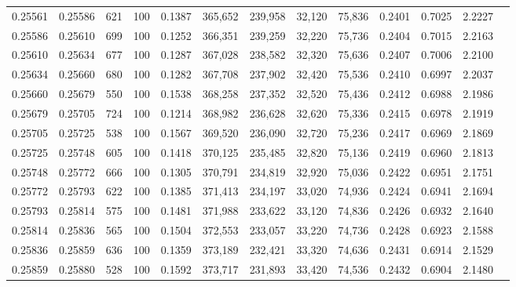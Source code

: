 \begin{tabular}{rrrrrrrrrrrrr}
0.25561 & 0.25586 &   621 & 100 &                                     0.1387 & 365,652 & 239,958 &  32,120 &  75,836 & 0.2401 & 0.7025 & 2.2227 \\
0.25586 & 0.25610 &   699 & 100 &                                     0.1252 & 366,351 & 239,259 &  32,220 &  75,736 & 0.2404 & 0.7015 & 2.2163 \\
0.25610 & 0.25634 &   677 & 100 &                                     0.1287 & 367,028 & 238,582 &  32,320 &  75,636 & 0.2407 & 0.7006 & 2.2100 \\
0.25634 & 0.25660 &   680 & 100 &                                     0.1282 & 367,708 & 237,902 &  32,420 &  75,536 & 0.2410 & 0.6997 & 2.2037 \\
0.25660 & 0.25679 &   550 & 100 &                                     0.1538 & 368,258 & 237,352 &  32,520 &  75,436 & 0.2412 & 0.6988 & 2.1986 \\
0.25679 & 0.25705 &   724 & 100 &                                     0.1214 & 368,982 & 236,628 &  32,620 &  75,336 & 0.2415 & 0.6978 & 2.1919 \\
0.25705 & 0.25725 &   538 & 100 &                                     0.1567 & 369,520 & 236,090 &  32,720 &  75,236 & 0.2417 & 0.6969 & 2.1869 \\
0.25725 & 0.25748 &   605 & 100 &                                     0.1418 & 370,125 & 235,485 &  32,820 &  75,136 & 0.2419 & 0.6960 & 2.1813 \\
0.25748 & 0.25772 &   666 & 100 &                                     0.1305 & 370,791 & 234,819 &  32,920 &  75,036 & 0.2422 & 0.6951 & 2.1751 \\
0.25772 & 0.25793 &   622 & 100 &                                     0.1385 & 371,413 & 234,197 &  33,020 &  74,936 & 0.2424 & 0.6941 & 2.1694 \\
0.25793 & 0.25814 &   575 & 100 &                                     0.1481 & 371,988 & 233,622 &  33,120 &  74,836 & 0.2426 & 0.6932 & 2.1640 \\
0.25814 & 0.25836 &   565 & 100 &                                     0.1504 & 372,553 & 233,057 &  33,220 &  74,736 & 0.2428 & 0.6923 & 2.1588 \\
0.25836 & 0.25859 &   636 & 100 &                                     0.1359 & 373,189 & 232,421 &  33,320 &  74,636 & 0.2431 & 0.6914 & 2.1529 \\
0.25859 & 0.25880 &   528 & 100 &                                     0.1592 & 373,717 & 231,893 &  33,420 &  74,536 & 0.2432 & 0.6904 & 2.1480 \\

\end{tabular}

